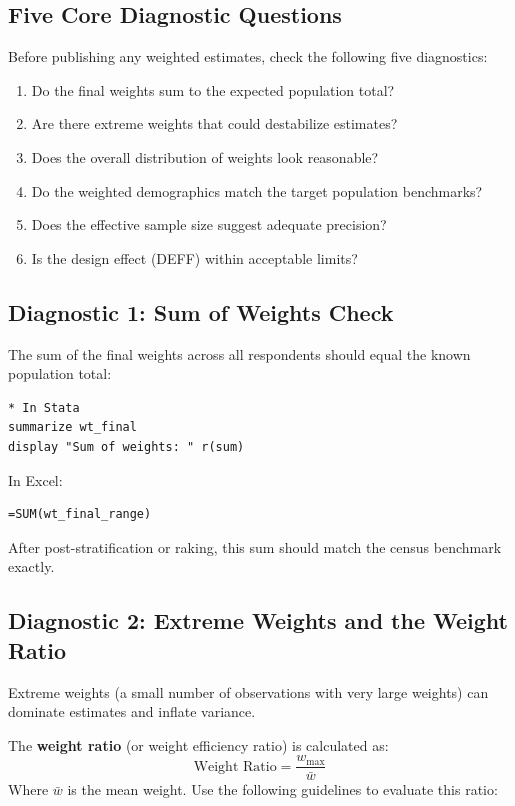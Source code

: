 \documentclass[11pt,a4paper]{article}
\begin{document}
\subsection{Five Core Diagnostic Questions}
Before publishing any weighted estimates, check the following five diagnostics:
\begin{enumerate}
  \item Do the final weights sum to the expected population total?
  \item Are there extreme weights that could destabilize estimates?
  \item Does the overall distribution of weights look reasonable?
  \item Do the weighted demographics match the target population benchmarks?
  \item Does the effective sample size suggest adequate precision?
  \item Is the design effect (DEFF) within acceptable limits?
\end{enumerate}

\subsection{Diagnostic 1: Sum of Weights Check}
The sum of the final weights across all respondents should equal the known population total:
\begin{lstlisting}[style=stata]
* In Stata
summarize wt_final
display "Sum of weights: " r(sum)
\end{lstlisting}
In Excel:
\begin{lstlisting}[style=excel]
=SUM(wt_final_range)
\end{lstlisting}
After post-stratification or raking, this sum should match the census benchmark exactly.

\subsection{Diagnostic 2: Extreme Weights and the Weight Ratio}
Extreme weights (a small number of observations with very large weights) can dominate estimates and inflate variance. 

The \textbf{weight ratio} (or weight efficiency ratio) is calculated as:
\begin{equation}
  \text{Weight Ratio} = \frac{w_{\max}}{\bar{w}}
\end{equation}
Where $\bar{w}$ is the mean weight. Use the following guidelines to evaluate this ratio:
\end{document}
